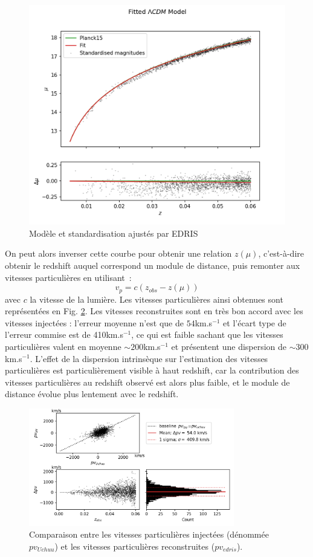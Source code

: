 \documentclass{book}
\begin{document}
\begin{figure}
    \centering
    \includegraphics[width=0.8\linewidth]{figures/edris_model_fit.png}
    \caption{Modèle et standardisation ajustés par EDRIS}
    \label{fig:edris_fit}
\end{figure}

On peut alors inverser cette courbe pour obtenir une relation $z(\mu)$, c'est-à-dire obtenir le redshift auquel correspond un module de distance, puis remonter aux vitesses particulières en utilisant~:
\begin{equation}
    v_p = c (z_{obs} - z(\mu))
\end{equation}
avec $c$ la vitesse de la lumière.
Les vitesses particulières ainsi obtenues sont représentées en Fig. \ref{fig:vp}. Les vitesses reconstruites sont en très bon accord avec les vitesses injectées : l'erreur moyenne n'est que de $54$km.s$^{-1}$ et l'écart type de l'erreur commise est de 410km.s$^{-1}$, ce qui est faible sachant que les vitesses particulières valent en moyenne $\sim 200$km.s$^{-1}$ et présentent une dispersion de $\sim 300$km.s$^{-1}$.   L'effet de la dispersion intrinsèque sur l'estimation des vitesses particulières est particulièrement visible à haut redshift, car la contribution des vitesses particulières au redshift observé est alors plus faible, et le module de distance évolue plus lentement avec le redshift.

\begin{figure}
    \centering
    \includegraphics[width=0.8\textwidth]{figures/edris_vp_uchuu_vs_edris.png}
    \caption{Comparaison entre les vitesses particulières injectées (dénommée $pv_{Uchuu}$) et les vitesses particulières reconstruites ($pv_{edris}$).}
    \label{fig:vp}
\end{figure}
\end{document}
